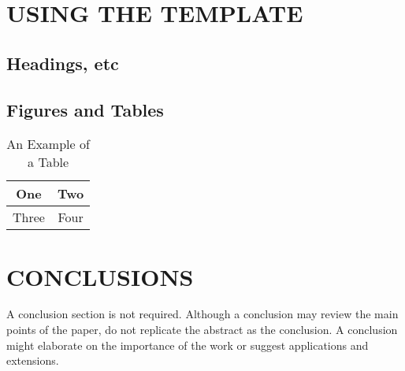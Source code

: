 \documentclass[a4paper, 10pt, conference]{ieeeconf}      %
\begin{document}
\section{USING THE TEMPLATE}

\subsection{Headings, etc}


\subsection{Figures and Tables}

\begin{table}[h]
\caption{An Example of a Table}
\label{table_example}
\begin{center}
\begin{tabular}{|c||c|}
\hline
One & Two\\
\hline
Three & Four\\
\hline
\end{tabular}
\end{center}
\end{table}




\section{CONCLUSIONS}

A conclusion section is not required. Although a conclusion may review the main points of the paper, do not replicate the abstract as the conclusion. A conclusion might elaborate on the importance of the work or suggest applications and extensions. 

\addtolength{\textheight}{-12cm}   %




\end{document}
